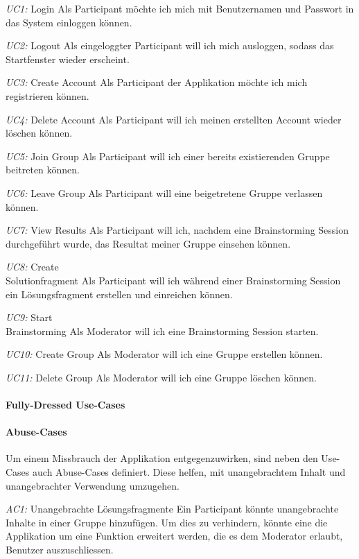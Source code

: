 \begin{basedescript}{
		\desclabelstyle{\multilinelabel}
		\desclabelwidth{4.5cm}}
	\item[\textit{UC1: }Login] Als Participant möchte ich mich mit Benutzernamen und Passwort in das System einloggen können.
	\item[\textit{UC2: }Logout] Als eingeloggter Participant will ich mich ausloggen, sodass das Startfenster wieder erscheint.
	\item[\textit{UC3: }Create Account] Als Participant der Applikation möchte ich mich registrieren können.
	\item[\textit{UC4: }Delete Account] Als Participant will ich meinen erstellten Account wieder löschen können.
	\item[\textit{UC5: }Join Group] Als Participant will ich einer bereits existierenden Gruppe beitreten können.
	\item[\textit{UC6: }Leave Group] Als Participant will eine beigetretene Gruppe verlassen können.
	\item[\textit{UC7: }View Results] Als Participant will ich, nachdem eine Brainstorming Session durchgeführt wurde, das Resultat meiner Gruppe einsehen können.
	\item[\textit{UC8: }Create\\Solutionfragment] Als Participant will ich während einer Brainstorming Session ein Lösungsfragment erstellen und einreichen können. 
	\item[\textit{UC9: }Start \\Brainstorming] Als Moderator will ich eine Brainstorming Session starten.
	\item[\textit{UC10: }Create Group] Als Moderator will ich eine Gruppe erstellen können. 
	\item[\textit{UC11: }Delete Group] Als Moderator will ich eine Gruppe löschen können.
\end{basedescript}

\paragraph{Fully-Dressed Use-Cases}

\paragraph{Abuse-Cases}
Um einem Missbrauch der Applikation entgegenzuwirken, sind neben den Use-Cases auch Abuse-Cases definiert. Diese helfen, mit unangebrachtem Inhalt und unangebrachter Verwendung umzugehen.
\begin{basedescript}{%
		\desclabelstyle{\multilinelabel}
		\desclabelwidth{4.5cm}}
	\item[\textit{AC1: }Unangebrachte Lösungsfragmente] Ein Participant könnte unangebrachte Inhalte in einer Gruppe hinzufügen. Um dies zu verhindern, könnte eine die Applikation um eine Funktion erweitert werden, die es dem Moderator erlaubt, Benutzer auszuschliessen.
\end{basedescript}

